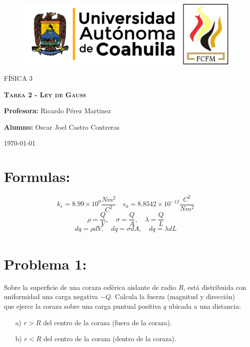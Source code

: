 \documentclass[12pt]{article}
\begin{document}
		
		\begin{titlepage}
		
			\centering
			{\bfseries
			\begin{figure}[h!]
				\centering
				\includegraphics[width=\linewidth]{Nom_UAdeC_FCFM.png} 				
			\end{figure}
			\par}
			\vspace{2cm}
			{\scshape\LARGE FÍSICA 3 \par}
			\vspace{3cm}
			{\scshape\Huge \textbf{Tarea 2 - Ley de Gauss} \par}
			\vfill
			{\LARGE \textbf{Profesora:} Ricardo Pérez Martinez \par}
			\vspace{3cm}
			{\LARGE \textbf{Alumno:} Oscar Joel Castro Contreras \par}
			\vfill
			{\Large \today \par}
			\thispagestyle{empty}
			
		\end{titlepage}
	
		\newpage
		
		\tableofcontents		
		
		\newpage
		
		\section*{Formulas:}\label{sec:Formulas}
			$$ k_e = 8.99 \times 10^9 \frac{Nm^2}{C^2} \quad \epsilon_0 = 8.8542 \times 10^{-12} \frac{C^2}{Nm^2} $$
			$$ \rho = \frac{Q}{V}, \quad \sigma = \frac{Q}{A}, \quad \lambda = \frac{Q}{L} $$
			$$ dq = \rho dV, \quad dq = \sigma dA, \quad dq = \lambda dL $$
			\begin{align}

			\end{align}

		\section{Problema 1:}\label{sec:Problema1}
			Sobre la superficie de una coraza esférica aislante de radio $ R $, está distribuida con
			uniformidad una carga negativa $ -Q $. Calcula la fuerza (magnitud y dirección) que
			ejerce la coraza sobre una carga puntual positiva $ q $ ubicada a una distancia:
			\begin{enumerate}
				\item[a)] $ r > R $ del centro de la coraza (fuera de la coraza).
				\item[b)] $ r < R $ del centro de la coraza (dentro de la coraza).
			\end{enumerate}
\end{document}

